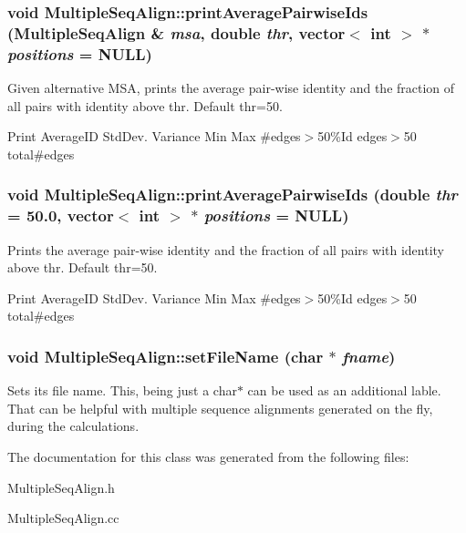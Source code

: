 \subsubsection{\setlength{\rightskip}{0pt plus 5cm}void Multiple\-Seq\-Align::print\-Average\-Pairwise\-Ids ({\bf Multiple\-Seq\-Align} \& {\em msa}, double {\em thr}, vector$<$ int $>$ $\ast$ {\em positions} = NULL)}\label{classMultipleSeqAlign_a27}


Given alternative MSA, prints the average pair-wise identity and the fraction of all pairs with identity above thr. Default thr=50. 

Print Average\-ID Std\-Dev. Variance Min Max \#edges$>$50\%Id edges$>$50 total\#edges 
\subsubsection{\setlength{\rightskip}{0pt plus 5cm}void Multiple\-Seq\-Align::print\-Average\-Pairwise\-Ids (double {\em thr} = 50.0, vector$<$ int $>$ $\ast$ {\em positions} = NULL)}\label{classMultipleSeqAlign_a25}


Prints the average pair-wise identity and the fraction of all pairs with identity above thr. Default thr=50. 

Print Average\-ID Std\-Dev. Variance Min Max \#edges$>$50\%Id edges$>$50 total\#edges 
\subsubsection{\setlength{\rightskip}{0pt plus 5cm}void Multiple\-Seq\-Align::set\-File\-Name (char $\ast$ {\em fname})\hspace{0.3cm}{\tt  [inline]}}\label{classMultipleSeqAlign_a19}


Sets its file name. This, being just a char$\ast$ can be used as an additional lable. That can be helpful with multiple sequence alignments generated on the fly, during the calculations. 

The documentation for this class was generated from the following files:\begin{CompactItemize}
\item 
Multiple\-Seq\-Align.h\item 
Multiple\-Seq\-Align.cc\end{CompactItemize}
